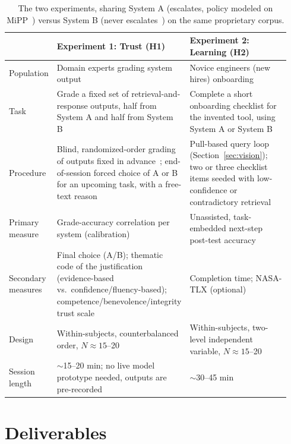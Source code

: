 \documentclass[sigconf,nonacm]{acmart}
\begin{document}
\begin{table}[t]
\centering\small
\begin{tabular}{@{}p{0.12\linewidth}p{0.41\linewidth}p{0.41\linewidth}@{}}
\toprule
 & \textbf{Experiment 1: Trust (H1)} & \textbf{Experiment 2: Learning (H2)} \\
\midrule
Population & Domain experts grading system output & Novice engineers (new hires) onboarding \\
Task & Grade a fixed set of retrieval-and-response outputs, half from System A and half from System B & Complete a short onboarding checklist for the invented tool, using System A or System B \\
Procedure & Blind, randomized-order grading of outputs fixed in advance~\cite{chakraborti2018, mohle2026}; end-of-session forced choice of A or B for an upcoming task, with a free-text reason & Pull-based query loop (Section~\ref{sec:vision}); two or three checklist items seeded with low-confidence or contradictory retrieval \\
Primary measure & Grade-accuracy correlation per system (calibration) & Unassisted, task-embedded next-step post-test accuracy \\
Secondary measures & Final choice (A/B); thematic code of the justification (evidence-based vs.\ confidence/fluency-based); competence/benevolence/integrity trust scale~\cite{mohle2026} & Completion time; NASA-TLX (optional) \\
Design & Within-subjects, counterbalanced order, $N \approx 15$--20 & Within-subjects, two-level independent variable, $N \approx 15$--20 \\
Session length & $\sim$15--20 min; no live model prototype needed, outputs are pre-recorded & $\sim$30--45 min \\
\bottomrule
\end{tabular}
\caption{The two experiments, sharing System A (escalates, policy modeled
on MiPP~\cite{sanchezadame2026}) versus System B (never
escalates~\cite{mishra2026}) on the same proprietary corpus.}
\label{tab:experiments}
\end{table}

\section{Deliverables}
\label{sec:deliverables}
\end{document}
